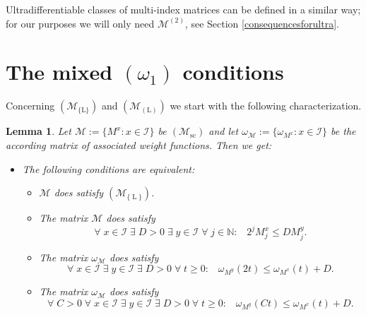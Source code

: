 \documentclass[10pt]{amsart}%
\numberwithin{equation}{section}
\theoremstyle{plain}
\newtheorem{lemma}[proposition]{Lemma}
\newcommand{\NN}{\mathbb{N}}
\let\on=\operatorname
\begin{document}
Ultradifferentiable classes of multi-index matrices can be defined in a similar way; for our purposes we will only need $\mathcal{M}^{(2)}$, see Section \ref{consequencesforultra}.

\section{The mixed $(\omega_1)$ conditions}\label{mixedomega1section}
Concerning \hyperlink{R-L}{$(\mathcal{M}_{\{\text{L}\}})$} and \hyperlink{B-L}{$(\mathcal{M}_{(\text{L})})$} we start with the following characterization.

\begin{lemma}\label{Lrewriting}
Let $\mathcal{M}:=\{M^x: x\in\mathcal{I}\}$ be \hyperlink{Msc}{$(\mathcal{M}_{\on{sc}})$} and let $\omega_{\mathcal{M}}:=\{\omega_{M^x}: x\in\mathcal{I}\}$ be the according matrix of associated weight functions. Then we get:
\begin{itemize}
\item[$(I)$]  The following conditions are equivalent:

\begin{itemize}
\item[$(i)$] $\mathcal{M}$ does satisfy \hyperlink{R-L}{$(\mathcal{M}_{\{\on{L}\}})$}.

\item[$(ii)$] The matrix $\mathcal{M}$ does satisfy
\begin{equation}\label{newLroum}
\forall\;x\in\mathcal{I}\;\exists\;D>0\;\exists\;y\in\mathcal{I}\;\forall\;j\in\NN:\;\;\;2^j M^x_j\le D M^y_j.
\end{equation}

\item[$(iii)$] The matrix $\omega_{\mathcal{M}}$ does satisfy
\begin{equation*}%
\forall\; x\in\mathcal{I}\;\exists\;y\in\mathcal{I}\;\exists\; D>0\;\forall\;t\ge 0:\;\;\; \omega_{M^y}(2t)\le \omega_{M^x}(t)+D.
\end{equation*}

\item[$(iv)$] The matrix $\omega_{\mathcal{M}}$ does satisfy
\begin{equation*}%
\forall\; C>0\;\forall\; x\in\mathcal{I}\;\exists\;y\in\mathcal{I}\;\exists\; D>0\;\forall\;t\ge 0:\;\;\; \omega_{M^y}(Ct)\le \omega_{M^x}(t)+D.
\end{equation*}
\end{itemize}


\end{itemize}
\end{lemma}
\end{document}
